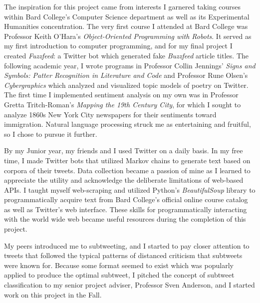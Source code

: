 \documentclass[11pt, twoside, reqno]{book}
\begin{document}
The inspiration for this project came from interests I garnered taking courses within Bard College's Computer Science department as well as its Experimental Humanities concentration. The very first course I attended at Bard College was Professor Keith O'Hara's \textit{Object-Oriented Programming with Robots}. It served as my first introduction to computer programming, and for my final project I created \textit{Fuzzfeed}: a Twitter bot which generated fake \textit{Buzzfeed} article titles. The following academic year, I wrote programs in Professor Collin Jennings' \textit{Signs and Symbols: Patter Recognition in Literature and Code} and Professor Rune Olsen's \textit{Cybergraphics} which analyzed and visualized topic models of poetry on Twitter. The first time I implemented sentiment analysis on my own was in Professor Gretta Tritch-Roman's \textit{Mapping the 19th Century City}, for which I sought to analyze 1860s New York City newspapers for their sentiments toward immigration. Natural language processing struck me as entertaining and fruitful, so I chose to pursue it further.

By my Junior year, my friends and I used Twitter on a daily basis. In my free time, I made Twitter bots that utilized Markov chains to generate text based on corpora of their tweets. Data collection became a passion of mine as I learned to appreciate the utility and acknowledge the deliberate limitations of web-based APIs. I taught myself web-scraping and utilized Python's \textit{BeautifulSoup} library to programmatically acquire text from Bard College's official online course catalog as well as Twitter's web interface. These skills for programmatically interacting with the world wide web became useful resources during the completion of this project.

My peers introduced me to subtweeting, and I started to pay closer attention to tweets that followed the typical patterns of distanced criticism that subtweets were known for. Because some format seemed to exist which was popularly applied to produce the optimal subtweet, I pitched the concept of subtweet classification to my senior project adviser, Professor Sven Anderson, and I started work on this project in the Fall.
\end{document}
